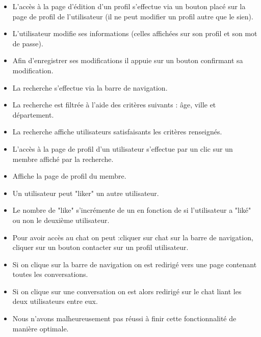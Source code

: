 \begin{itemize}
 \item L'accès à la page d'édition d'un profil s'effectue via un bouton placé sur la page de profil de l'utilisateur (il ne peut modifier un profil autre que le sien).
 \item L'utilisateur modifie ses informations (celles affichées sur son profil et son mot de passe).
 \item Afin d'enregistrer ses modifications il appuie sur un bouton confirmant sa modification.
\end{itemize}


\begin{itemize}
 \item La recherche s'effectue via la barre de navigation.
 \item La recherche est filtrée à l'aide des critères suivants : âge, ville et département.
 \item La recherche affiche utilisateurs satisfaisants les critères renseignés.
\end{itemize}

\begin{itemize}
 \item L'accès à la page de profil d'un utilisateur s'effectue par un clic sur un membre affiché par la recherche.
 \item Affiche la page de profil du membre.
\end{itemize}

\begin{itemize}
 \item Un utilisateur peut "liker" un autre utilisateur.
 \item Le nombre de "like" s'incrémente de un en fonction de si l'utilisateur a "liké" ou non le deuxième utilisateur.
\end{itemize}


\begin{itemize}
\item Pour avoir accès au chat on peut :cliquer sur chat sur la barre de navigation, cliquer sur un bouton contacter sur un profil utilisateur.
\item Si on clique sur la barre de navigation on est redirigé vers une page contenant toutes les conversations.
\item Si on clique sur une conversation on est alors redirigé sur le chat liant les deux utilisateurs entre eux.
\item Nous n'avons malheureusement pas réussi à finir cette fonctionnalité de manière optimale.
\end{itemize}

